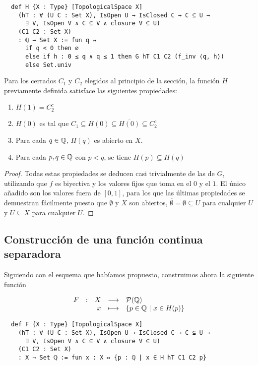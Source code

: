 \begin{lstlisting}
  def H {X : Type} [TopologicalSpace X]
    (hT : ∀ (U C : Set X), IsOpen U → IsClosed C → C ⊆ U →
      ∃ V, IsOpen V ∧ C ⊆ V ∧ closure V ⊆ U)
    (C1 C2 : Set X)
    : ℚ → Set X := fun q ↦
      if q < 0 then ∅
      else if h : 0 ≤ q ∧ q ≤ 1 then G hT C1 C2 (f_inv ⟨q, h⟩)
      else Set.univ
\end{lstlisting}

\begin{lemma}
  Para los cerrados $C_1$ y $C_2$ elegidos al principio de la sección, la función $H$ previamente definida satisface las siguientes propiedades:
  \begin{enumerate}
    \item $H(1) = C_2^c$
    \item $H(0)$ es tal que $C_1 \subseteq H(0) \subseteq \overline{H(0)} \subseteq C_2^c$
    \item Para cada $q \in \mathbb{Q}$, $H(q)$ es abierto en $X$.
    \item Para cada $p, q \in \mathbb{Q}$ con $p < q$, se tiene $\overline{H(p)} \subseteq H(q)$
  \end{enumerate}
\end{lemma}

\begin{proof}
  Todas estas propiedades se deducen casi trivialmente de las de $G$, utilizando que $f$ es biyectiva y los valores fijos que toma en el $0$ y el $1$. El único añadido son los valores fuera de $[0, 1]$, para los que las últimas propiedades se demuestran fácilmente puesto que $\emptyset$ y $X$ son abiertos, $\overline{\emptyset} = \emptyset \subseteq U$ para cualquier $U$ y $U \subseteq X$ para cualquier $U$.
\end{proof}

\subsection{Construcción de una función continua separadora}

Siguiendo con el esquema que habíamos propuesto, construimos ahora la siguiente función

$$
\begin{array}{rcrcl}
  F & : & X & \longrightarrow & \mathcal{P}(\mathbb{Q}) \\
    & & x & \longmapsto & \{p \in \mathbb{Q} ~|~ x \in H(p)\}
\end{array}
$$

\begin{lstlisting}
  def F {X : Type} [TopologicalSpace X]
    (hT : ∀ (U C : Set X), IsOpen U → IsClosed C → C ⊆ U →
      ∃ V, IsOpen V ∧ C ⊆ V ∧ closure V ⊆ U)
    (C1 C2 : Set X)
    : X → Set ℚ := fun x : X ↦ {p : ℚ | x ∈ H hT C1 C2 p}
\end{lstlisting}


